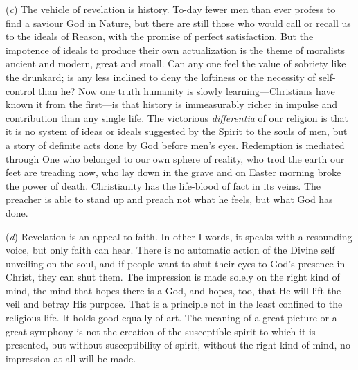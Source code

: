 \documentclass[12pt,a5paper]{article}
\begin{document}
(\textit{c}) The vehicle of revelation is history. To-day fewer men than ever profess to find a saviour God in Nature, but there are still those who would call or recall us to the ideals of Reason, with the promise of perfect satisfaction. But the impotence of ideals to produce their own actualization is the theme of moralists ancient and modern, great and small. Can any one feel the value of sobriety like the drunkard; is any less inclined to deny the loftiness or the necessity of self-control than he? Now one truth humanity is slowly learning---Christians have known it from the first---is that history is immeasurably richer in impulse and contribution than any single life. The victorious \textit{differentia} of our religion is that it is no system of ideas or ideals suggested by the Spirit to the souls of men, but a story of definite acts done by God before men's eyes. Redemption is mediated through One who belonged to our own sphere of reality, who trod the earth our feet are treading now, who lay down in the grave and on Easter morning broke the power of death. Christianity has the life-blood of fact in its veins. The preacher is able to stand up and preach not what he feels, but what God has done.

(\textit{d}) Revelation is an appeal to faith. In other I words, it speaks with a resounding voice, but only faith can hear. There is no automatic action
of the Divine self unveiling on the soul, and if people want to shut their eyes to God's presence in Christ, they can shut them. The impression is made solely on the right kind of mind, the mind that hopes there is a God, and hopes, too, that He will lift the veil and betray His purpose. That is a principle not in the least confined to the religious life. It holds good equally of art. The meaning of a great picture or a great symphony is not the creation of the susceptible spirit to which it is presented, but without susceptibility of spirit, without the right kind of mind, no impression at all will be made. 
\end{document}
